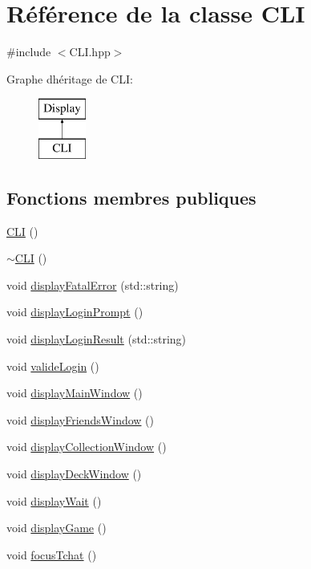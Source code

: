 \hypertarget{classCLI}{}\section{Référence de la classe C\+L\+I}
\label{classCLI}


{\ttfamily \#include $<$C\+L\+I.\+hpp$>$}

Graphe d\textquotesingle{}héritage de C\+L\+I\+:\begin{figure}[H]
\begin{center}
\leavevmode
\includegraphics[height=2.000000cm]{classCLI}
\end{center}
\end{figure}
\subsection*{Fonctions membres publiques}
\begin{DoxyCompactItemize}
\item 
\hyperlink{classCLI_a1a5b0f7ec3b242c5c56e4745adbb391e}{C\+L\+I} ()
\item 
\hyperlink{classCLI_a9f59d57abf434f7161fcf3f61b725752}{$\sim$\+C\+L\+I} ()
\item 
void \hyperlink{classCLI_ae86da329edfde03f238c778481be2030}{display\+Fatal\+Error} (std\+::string)
\item 
void \hyperlink{classCLI_a6cf4acf9f7fa587cc49b892487c68f13}{display\+Login\+Prompt} ()
\item 
void \hyperlink{classCLI_abf864752edc73dba33fce8a0f06137c4}{display\+Login\+Result} (std\+::string)
\item 
void \hyperlink{classCLI_ac900759039333051b414c9002dd2100c}{valide\+Login} ()
\item 
void \hyperlink{classCLI_abcf6f643c8a94e0451b4b6d9ab9546c7}{display\+Main\+Window} ()
\item 
void \hyperlink{classCLI_a6b70a2b3d08d24f99826051c56a786e6}{display\+Friends\+Window} ()
\item 
void \hyperlink{classCLI_af20da7ff64f241fdd3659b66ffacedd4}{display\+Collection\+Window} ()
\item 
void \hyperlink{classCLI_a166fe45276733200e237c0d9cce3f801}{display\+Deck\+Window} ()
\item 
void \hyperlink{classCLI_ab6c8531d0ab6d343936a83edbb14703c}{display\+Wait} ()
\item 
void \hyperlink{classCLI_acef2afe60b53453ebf7ed52f4f06621e}{display\+Game} ()
\item 
void \hyperlink{classCLI_a2606c83484b8d0fa1fb6ea9ac2fe07de}{focus\+Tchat} ()
\end{DoxyCompactItemize}


